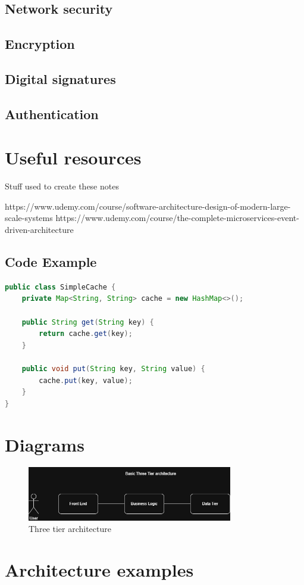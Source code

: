 \documentclass[a4paper, 11pt]{book}
\begin{document}
    \section{Network security}


    \section{Encryption}


    \section{Digital signatures}


    \section{Authentication}


    \chapter{Useful resources}
    Stuff used to create these notes

    https://www.udemy.com/course/software-architecture-design-of-modern-large-scale-systems
    https://www.udemy.com/course/the-complete-microservices-event-driven-architecture

    \newpage



    \section{Code Example}
    \begin{lstlisting}[language=Java, caption=Java Code for a Simple Cache]
public class SimpleCache {
    private Map<String, String> cache = new HashMap<>();

    public String get(String key) {
        return cache.get(key);
    }

    public void put(String key, String value) {
        cache.put(key, value);
    }
}
    \end{lstlisting}


    \chapter{Diagrams}

    \begin{figure}[h]
        \centering
        \includegraphics[width=0.8\textwidth]{basic-architecture} %
        \caption{Three tier architecture}
        \label{fig:drawio-diagram}
    \end{figure}


    \chapter{Architecture examples}
\end{document}
